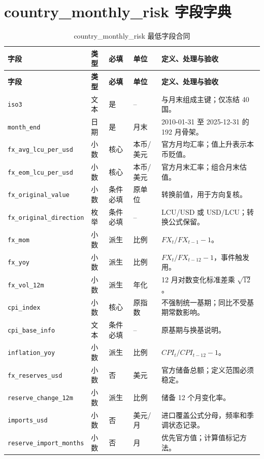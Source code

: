 \documentclass[UTF8,fontset=windows,12pt,openany]{ctexbook}
\newcommand{\Field}[1]{{\small\nolinkurl{#1}}}
\begin{document}
\chapter{country\_monthly\_risk 字段字典}
\clearpage
\begin{landscape}
\begin{longtable}{p{4.0cm}p{2.3cm}p{2.3cm}p{2.7cm}p{7.2cm}}
\caption{country\_monthly\_risk 最低字段合同}\label{tab:dict-monthly}\\
\toprule
\textbf{字段} & \textbf{类型} & \textbf{必填} & \textbf{单位} & \textbf{定义、处理与验收}\\
\midrule
\endfirsthead
\toprule \textbf{字段} & \textbf{类型} & \textbf{必填} & \textbf{单位} & \textbf{定义、处理与验收}\\ \midrule
\endhead
\Field{iso3} & 文本 & 是 & -- & 与月末组成主键；仅冻结 40 国。\\
\Field{month_end} & 日期 & 是 & 月末 & 2010-01-31 至 2025-12-31 的 192 月骨架。\\
\Field{fx_avg_lcu_per_usd} & 小数 & 核心 & 本币/美元 & 官方月均汇率；值上升表示本币贬值。\\
\Field{fx_eom_lcu_per_usd} & 小数 & 核心 & 本币/美元 & 官方月末汇率；组合月末估值。\\
\Field{fx_original_value} & 小数 & 条件必填 & 原单位 & 转换前值，用于方向复核。\\
\Field{fx_original_direction} & 枚举 & 条件必填 & -- & LCU/USD 或 USD/LCU；转换公式保留。\\
\Field{fx_mom} & 小数 & 派生 & 比例 & \(FX_t/FX_{t-1}-1\)。\\
\Field{fx_yoy} & 小数 & 派生 & 比例 & \(FX_t/FX_{t-12}-1\)，事件触发用。\\
\Field{fx_vol_12m} & 小数 & 派生 & 年化 & 12 月对数变化标准差乘 \(\sqrt{12}\)。\\
\Field{cpi_index} & 小数 & 核心 & 原指数 & 不强制统一基期；同比不受基期常数影响。\\
\Field{cpi_base_info} & 文本 & 条件必填 & -- & 原基期与换基说明。\\
\Field{inflation_yoy} & 小数 & 派生 & 比例 & \(CPI_t/CPI_{t-12}-1\)。\\
\Field{fx_reserves_usd} & 小数 & 否 & 美元 & 官方储备总额；定义范围必须稳定。\\
\Field{reserve_change_12m} & 小数 & 派生 & 比例 & 储备 12 个月变化率。\\
\Field{imports_usd} & 小数 & 否 & 美元/月 & 进口覆盖公式分母，频率和季调状态记录。\\
\Field{reserve_import_months} & 小数 & 否 & 月 & 优先官方值；计算值标记方法。\\

\end{longtable}
\end{landscape}
\end{document}
